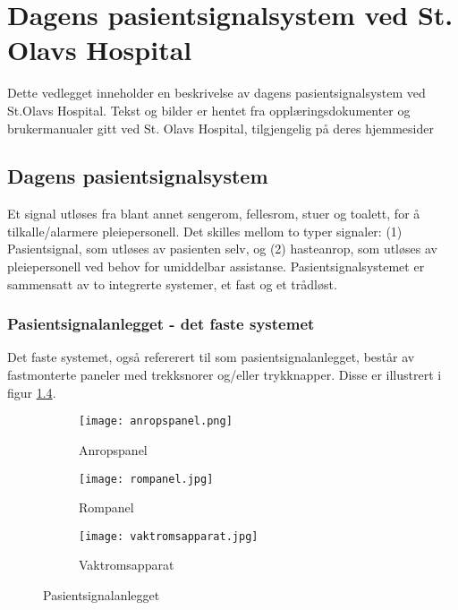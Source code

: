 \chapter{Dagens pasientsignalsystem ved St. Olavs Hospital}
\label{chp:appendix_dagenssystem}
Dette vedlegget inneholder en beskrivelse av dagens pasientsignalsystem ved St.Olavs Hospital. Tekst og bilder er hentet fra opplæringsdokumenter og brukermanualer gitt ved St. Olavs Hospital, tilgjengelig på deres hjemmesider \citep{BrukerveiledningforPasientsignal, BrukermanualforPasientsignalogPasientsignalapplikasjon, BrukerveiledningforTradlostelefon}

\section{Dagens pasientsignalsystem}
Et signal utløses fra blant annet sengerom, fellesrom, stuer og toalett, for å tilkalle/alarmere pleiepersonell. Det skilles mellom to typer signaler: (1) Pasientsignal, som utløses av pasienten selv, og (2) hasteanrop, som utløses av pleiepersonell ved behov for umiddelbar assistanse. Pasientsignalsystemet er sammensatt av to integrerte systemer, et fast og et trådløst. 

\subsection{Pasientsignalanlegget - det faste systemet}
Det faste systemet, også refererert til som pasientsignalanlegget, består av fastmonterte paneler med trekksnorer og/eller trykknapper. Disse er illustrert i figur \ref{pasientsignalanlegget}.

\begin{figure}[H]
        \centering
        \begin{subfigure}[b]{0.3\textwidth}
        		\centering
                \texttt{[image: anropspanel.png]}
                \caption{Anropspanel}
                \label{anropspanel}
        \end{subfigure}%
        \begin{subfigure}[b]{0.3\textwidth}
        		\centering
                \texttt{[image: rompanel.jpg]}
                \caption{Rompanel}
                \label{rompanel}
        \end{subfigure}
        \begin{subfigure}[b]{0.3\textwidth}
        		\centering
                \texttt{[image: vaktromsapparat.jpg]}
                \caption{Vaktromsapparat}
                \label{vaktromsapparat}
        \end{subfigure}
        \caption{Pasientsignalanlegget}
        \label{pasientsignalanlegget}
\end{figure}

